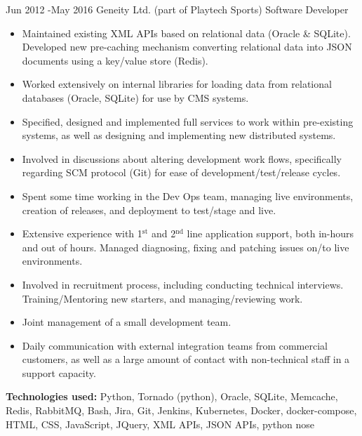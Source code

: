 \documentclass[10pt]{article} %
\begin{document}
\jobheader
{Jun 2012 -}{May 2016}
{Geneity Ltd. (part of Playtech Sports)}
{Software Developer}
\vspace{-1cm}
  \begin{itemize}

  \item Maintained existing XML APIs based on relational data (Oracle \& SQLite).
        Developed new pre-caching mechanism converting relational data into JSON documents
        using a key/value store (Redis).

  \item Worked extensively on internal libraries for loading data from relational databases
        (Oracle, SQLite) for use by CMS systems.

  \item Specified, designed and implemented full services to work within
        pre-existing systems, as well as designing and implementing new distributed systems.

  \item Involved in discussions about altering development work flows, specifically regarding
        SCM protocol (Git) for ease of development/test/release cycles.

  \item Spent some time working in the Dev Ops team, managing live environments, creation
        of releases, and deployment to test/stage and live.

  \item Extensive experience with 1$^{\textrm{st}}$ and 2$^{\textrm{nd}}$ line application
        support, both in-hours and out of hours. Managed diagnosing, fixing and patching
        issues on/to live environments.

  \item Involved in recruitment process, including conducting technical interviews.
        Training/Mentoring new starters, and managing/reviewing work.

  \item Joint management of a small development team.

  \item Daily communication with external integration teams from commercial customers, as well as
        a large amount of contact with non-technical staff in a support capacity.


  \end{itemize}

  \textbf{Technologies used:}
  Python, Tornado (python),
  Oracle, SQLite,
  Memcache, Redis,
  RabbitMQ,
  Bash,
  Jira, Git, Jenkins,
  Kubernetes, Docker, docker-compose,
  HTML, CSS, JavaScript, JQuery,
  XML APIs, JSON APIs,
  python nose
\end{document}
